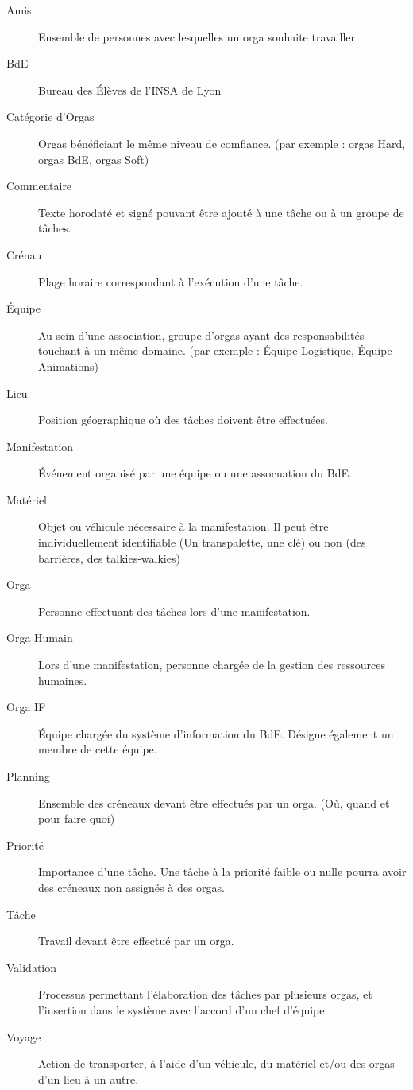 \begin{description}
\item[Amis] Ensemble de personnes avec lesquelles un orga souhaite travailler 
\item[BdE] Bureau des Élèves de l'INSA de Lyon
\item[Catégorie d'Orgas] Orgas bénéficiant le même niveau de comfiance. (par exemple : orgas Hard, orgas BdE, orgas Soft)
\item[Commentaire] Texte horodaté et signé pouvant être ajouté à une tâche ou à un groupe de tâches.
\item[Crénau] Plage horaire correspondant à l'exécution d'une tâche.
\item[Équipe] Au sein d'une association, groupe d'orgas ayant des responsabilités touchant à un même domaine. (par exemple : Équipe Logistique, Équipe Animations)
\item[Lieu] Position géographique où des tâches doivent être effectuées.
\item[Manifestation] Événement organisé par une équipe ou une assocuation du BdE.
\item[Matériel] Objet ou véhicule nécessaire à la manifestation. Il peut être individuellement identifiable (Un transpalette, une clé) ou non (des barrières, des talkies-walkies)
\item[Orga] Personne effectuant des tâches lors d'une manifestation.
\item[Orga Humain] Lors d'une manifestation, personne chargée de la gestion des ressources humaines.
\item[Orga IF] Équipe chargée du système d'information du BdE. Désigne également un membre de cette équipe.
\item[Planning] Ensemble des créneaux devant être effectués par un orga. (Où, quand et pour faire quoi)
\item[Priorité] Importance d'une tâche. Une tâche à la priorité faible ou nulle pourra avoir des créneaux non assignés à des orgas.
\item[Tâche] Travail devant être effectué par un orga.
\item[Validation] Processus permettant l'élaboration des tâches par plusieurs orgas, et l'insertion dans le système avec l'accord d'un chef d'équipe.
\item[Voyage] Action de transporter, à l'aide d'un véhicule, du matériel et/ou des orgas d'un lieu à un autre.


 \end{description}